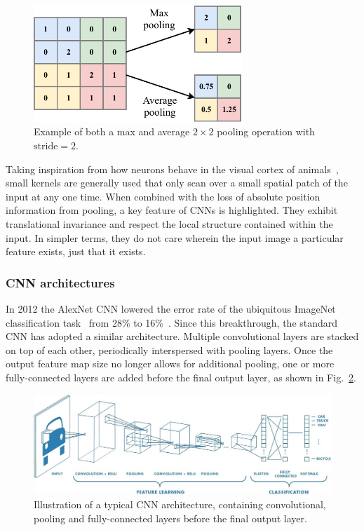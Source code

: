 \begin{figure} %
    \includegraphics[width=0.7\textwidth]{diagrams/6-cnn/pooling.pdf}
    \caption[Example of pooling operation]
    {Example of both a max and average $2 \times 2$ pooling operation with $\mathrm{stride}=2$.}
    \label{fig:pooling}
\end{figure}

Taking inspiration from how neurons behave in the visual cortex of animals~\cite{lecun2015}, small
kernels are generally used that only scan over a small spatial patch of the input at any one time.
When combined with the loss of absolute position information from pooling, a key feature of CNNs
is highlighted. They exhibit translational invariance and respect the local structure contained
within the input. In simpler terms, they do not care wherein the input image a particular feature
exists, just that it exists.

\subsubsection*{CNN architectures}

In 2012 the AlexNet CNN lowered the error rate of the ubiquitous ImageNet classification
task~\cite{deng2009} from 28\% to 16\%~\cite{krizhevsky2012}. Since this breakthrough, the
standard CNN has adopted a similar architecture. Multiple convolutional layers are stacked on top
of each other, periodically interspersed with pooling layers. Once the output feature map size no
longer allows for additional pooling, one or more fully-connected layers are added before the
final output layer, as shown in Fig.~\ref{fig:conv_diagram}.

\begin{figure} %
    \includegraphics[width=\textwidth]{diagrams/6-cnn/conv_diagram.jpeg}
    \caption[Typical Convolutional Neural Network architecture]
    {Illustration of a typical CNN architecture, containing convolutional, pooling and
        fully-connected layers before the final output layer.}
    \label{fig:conv_diagram}
\end{figure}

